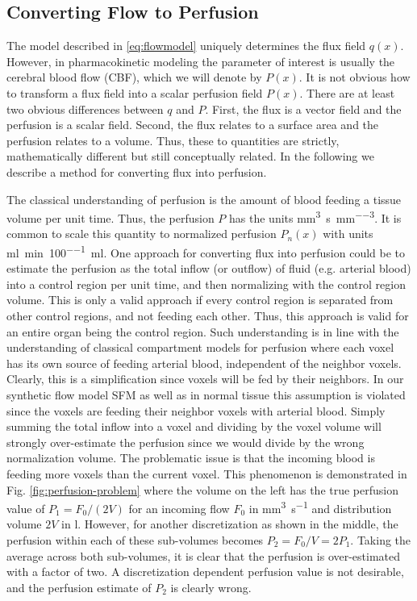 \documentclass[paper=a4, fontsize=11pt,parskip=half,headings=small]{scrartcl}
\newcommand{\siqt}{\milli\meter\cubed\per\second}
\newcommand{\siP}{\milli\meter\cubed\per\second\per\milli\meter\cubed}
\newcommand{\siPn}{\milli\litre\per\minute\per100\milli\litre}
\begin{document}
	\subsection{Converting Flow to Perfusion}\label{sec:flux2perf}
	The model described in \eqref{eq:flowmodel} uniquely determines the flux field $q(x)$. 
	However, in pharmacokinetic modeling the parameter of interest is usually the cerebral blood flow (CBF), which we will denote by $P(x)$.
	It is not obvious how to transform a flux field into a scalar perfusion field $P(x)$.
	There are at least two obvious differences between $q$ and $P$. 
	First, the flux is a vector field and the perfusion is a scalar field. 
	Second, the flux relates to a surface area and the perfusion relates to a volume. 
	Thus, these to quantities are strictly, mathematically different but still conceptually related. 
	In the following we describe a method for converting flux into perfusion.

	The classical understanding of perfusion is the amount of blood feeding a tissue volume per unit time. 
	Thus, the perfusion $P$ has the units \si{\siP}.
	It is common to scale this quantity to normalized perfusion $P_n(x)$ with units \si{\siPn}. 
	One approach for converting flux into perfusion could be to estimate the perfusion as the total inflow (or outflow) of fluid (e.g. arterial blood) into a control region per unit time, and then normalizing with the control region volume. 
	This is only a valid approach if every control region is separated from other control regions, and not feeding each other. 
	Thus, this approach is valid for an entire organ being the control region. 
	Such understanding is in line with the understanding of classical compartment models for perfusion where each voxel has its own source of feeding arterial blood, independent of the neighbor voxels. 
	Clearly, this is a simplification since voxels will be fed by their neighbors. 
	In our synthetic flow model SFM as well as in normal tissue this assumption is violated since the voxels are feeding their neighbor voxels with arterial blood. 
	Simply summing the total inflow into a voxel and dividing by the voxel volume will strongly over-estimate the perfusion since we would divide by the wrong normalization volume. 
	The problematic issue is that the incoming blood is feeding more voxels than the current voxel. 
	This phenomenon is demonstrated in Fig. \ref{fig:perfusion-problem} where the volume on the left has the true perfusion value of $P_1 = F_0/(2V)$ for an incoming flow $F_0$ in \si{\siqt} and distribution volume $2V$ in \si{\litre}. 
	However, for another discretization as shown in the middle, the perfusion within each of these sub-volumes becomes $P_2 = F_0/V = 2P_1$. 
	Taking the average across both sub-volumes, it is clear that the perfusion is over-estimated with a factor of two. 
	A discretization dependent perfusion value is not desirable, and the perfusion estimate of $P_2$ is clearly wrong. 
\end{document}
